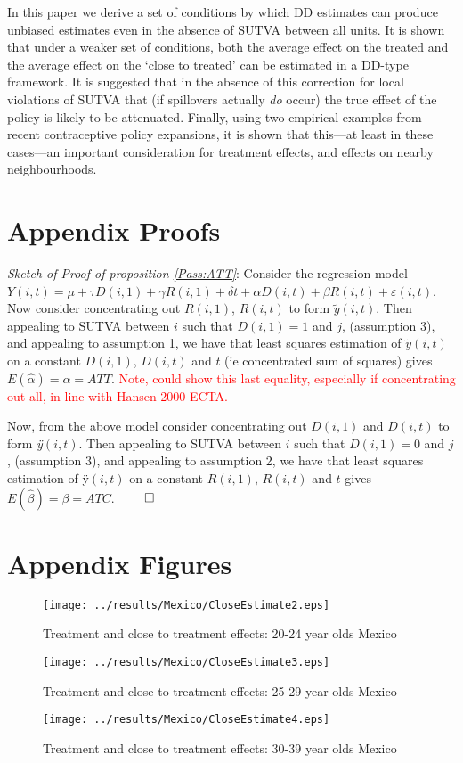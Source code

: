 \documentclass{article}
\begin{document}
\begin{spacing}{1.1}
In this paper we derive a set of conditions by which DD estimates can produce 
unbiased estimates even in the absence of SUTVA between all units.  It is shown
that under a weaker set of conditions, both the average effect on the treated
and the average effect on the `close to treated' can be estimated in a DD-type
framework.  It is suggested that in the absence of this correction for local 
violations of SUTVA that (if spillovers actually \emph{do} occur) the true 
effect of the policy is likely to be attenuated.  Finally, using two empirical 
examples from recent contraceptive policy expansions, it is shown that this---at
least in these cases---an important consideration for treatment effects, and
effects on nearby neighbourhoods.


\newpage

\newpage

\appendix
\section{Appendix Proofs}
\emph{Sketch of Proof of proposition \ref{Pass:ATT}}: Consider the regression 
model $Y(i,t)=\mu+\tau D(i,1) + \gamma R(i,1) + \delta t + \alpha D(i,t) + 
\beta R(i,t) + \varepsilon(i,t)$.  Now consider concentrating out $R(i,1)$, 
$R(i,t)$ to form $\tilde{y}(i,t)$.  Then appealing to SUTVA between $i$ such 
that $D(i,1)=1$ and $j$, (assumption 3), and appealing to assumption 1, we have 
that least squares estimation of $\tilde{y}(i,t)$ on a constant $D(i,1)$,
$D(i,t)$ and $t$ (ie concentrated sum of squares) gives
$E(\hat\alpha)=\alpha=ATT$.  \textcolor{red}{Note, could show this
  last equality, especially if concentrating out all, in line with
  Hansen 2000 ECTA.}

Now, from the above model consider concentrating out $D(i,1)$ and $D(i,t)$
to form \emph{\"{y}}$(i,t)$.  Then appealing to SUTVA between $i$ such 
that $D(i,1)=0$ and $j$, (assumption 3), and appealing to assumption 2, we 
have that least squares estimation of \"{y}$(i,t)$ on a constant $R(i,1)$,
$R(i,t)$ and $t$ gives $E(\hat\beta)=\beta=ATC$. $\qed$



\section{Appendix Figures}
\label{Sscn:Agraphs}
\begin{figure}[htpb!]
\texttt{[image: ../results/Mexico/CloseEstimate2.eps]}
\caption{Treatment and close to treatment effects: 20-24 year olds Mexico}
\end{figure}
\begin{figure}[htpb!]
\texttt{[image: ../results/Mexico/CloseEstimate3.eps]}
\caption{Treatment and close to treatment effects: 25-29 year olds Mexico}
\end{figure}
\begin{figure}[htpb!]
\texttt{[image: ../results/Mexico/CloseEstimate4.eps]}
\caption{Treatment and close to treatment effects: 30-39 year olds Mexico}
\end{figure}


\end{spacing}
\end{document}
